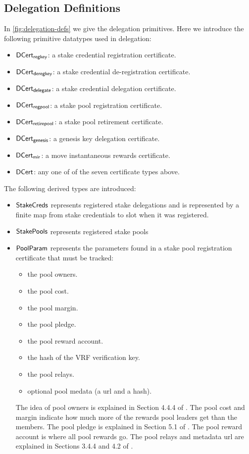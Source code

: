 \subsection{Delegation Definitions}
\label{sec:deleg-defs}

In \cref{fig:delegation-defs} we give the delegation primitives.
Here we introduce the following primitive datatypes used in delegation:

\begin{itemize}
\item $\mathsf{DCert_{regkey}}$: a stake credential registration certificate.
\item $\mathsf{DCert_{deregkey}}$: a stake credential de-registration certificate.
\item $\mathsf{DCert_{delegate}}$: a stake credential delegation certificate.
\item $\mathsf{DCert_{regpool}}$: a stake pool registration certificate.
\item $\mathsf{DCert_{retirepool}}$: a stake pool retirement certificate.
\item $\mathsf{DCert_{genesis}}$: a genesis key delegation certificate.
\item $\mathsf{DCert_{mir}}$: a move instantaneous rewards certificate.
\item $\mathsf{DCert}$: any one of of the seven certificate types above.
\end{itemize}
The following derived types are introduced:
\begin{itemize}
\item $\mathsf{StakeCreds}$ represents registered stake delegations and is
  represented by a finite map from stake credentials to slot when it was
  registered.
\item$\mathsf{StakePools}$ represents registered stake pools
\item $\mathsf{PoolParam}$ represents the parameters found in a stake pool registration certificate
  that must be tracked:
  \begin{itemize}
    \item the pool owners.
    \item the pool cost.
    \item the pool margin.
    \item the pool pledge.
    \item the pool reward account.
    \item the hash of the VRF verification key.
    \item the pool relays.
    \item optional pool medata (a url and a hash).
  \end{itemize}
  The idea of pool owners is explained in Section 4.4.4 of \cite{delegation_design}.
  The pool cost and margin indicate how much more of the rewards pool leaders
  get than the members.
  The pool pledge is explained in Section 5.1 of \cite{delegation_design}.
  The pool reward account is where all pool rewards go.
  The pool relays and metadata url are explained in Sections
  3.4.4 and 4.2 of \cite{delegation_design}.
\end{itemize}

